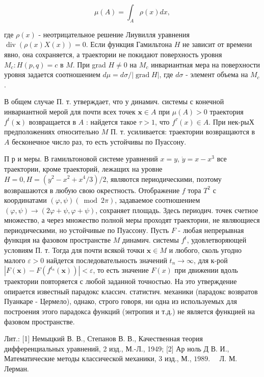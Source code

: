 \documentclass[10pt]{article}
\begin{document}
\[

\mu(A)=\int_{A} \rho(x) d x,

\]



где $\rho(x)$ - неотрицательное решение Лиувилля уравнения $\operatorname{div}(\rho(x) X(x))=0$. Если функция Гамильтона $H$ не зависит от времени явно, она сохраняется, а траектории не покидают поверхность уровня $M_{c}: H(p, q)=c$ в $M$. При grad $H \neq 0$ на $M_{c}$ инвариантная мера на поверхности уровня задается соотношением $d \mu=d \sigma /|\operatorname{grad} H|$, где $d \sigma$ - элемент объема на $M_{c}$.



В общем случае П. т. утверждает, что у динамич. системы с конечной инвариантной мерой для почти всех точек $\boldsymbol{x} \in A$ при $\mu(A)>0$ траектория $f^{t}(\boldsymbol{x})$ возвращается в $A$ : найдется такое $\tau>1$, что $f^{\tau}(x) \in A$. При нек-рыХ предположениях относительно $M$ П. т. усиливается: траектории возвращаются в $A$ бесконечное число раз, то есть устойчивы по Пуассону.



П р и меры. В гамильтоновой системе уравнений $x=y$, $\dot{y}=x-x^{3}$ все траектории, кроме траекторий, лежащих на уровне $H=0, H=\left(y^{2}-x^{2}+x^{4} / 3\right) / 2$, являются периодическими, поэтому возврашаются в любую свою окрестность. Отображение $f$ тора $T^{2}$ с координатами $(\varphi, \psi)(\bmod 2 \pi)$, задаваемое соотношением $(\varphi, \psi) \rightarrow(2 \varphi+\psi, \varphi+\psi)$, сохраняет площадь. Здесь периодич. точек счетное множество, а через множество полной меры проходят траектории, не являющиеся периодическими, но устойчивые по Пуассону. Пусть $F$ - любая непрерывная функция на фазовом пространстве $M$ динамич. системы $f^{t}$, удовлетворяющей условиям П. т. Тогда для почти всякой точки $\boldsymbol{x} \in M$ и любого, сколь угодно малого $\varepsilon>0$ найдется последовательность значений $t_{n} \rightarrow \infty$, для к-рой $\left|F(\boldsymbol{x})-F\left(f^{t_{n}}(\boldsymbol{x})\right)\right|<\varepsilon$, то есть значение $F(x)$ при движении вдоль траектории повторяется с любой заданной точностью. На это утверждение опирается известный парадокс классич. статистич. механики (парадокс возвратов Пуанкаре - Цермело), однако, строго говоря, ни одна из используемых для построения этого парадокса функций (энтропия и т.д.) не является функцией на фазовом пространстве.



Лит.: [1] Немыцкий В. В., Степанов В. В., Качественная теория дифференциальных уравнений, 2 изд., М.-Л., 1949; [2] Ар ноль Д В. И., Математические методы классической механики, 3 изд., М., $1989 . \quad$ Л. М. Лерман.
\end{document}
